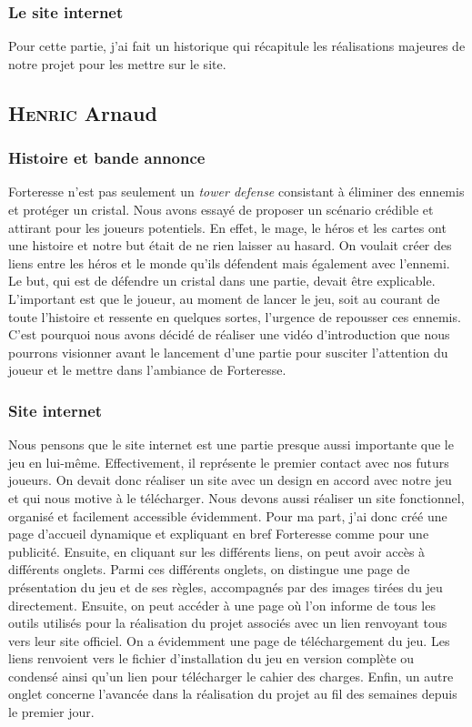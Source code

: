 \documentclass[a4paper, 12pt]{article}
\begin{document}
\subsubsection{Le site internet}
Pour cette partie, j'ai fait un historique qui r\'ecapitule les r\'ealisations majeures de notre projet pour les mettre sur le site.


	\subsection{\textsc{Henric} Arnaud}
	\subsubsection{Histoire et bande annonce}
	Forteresse n’est pas seulement un \textit{tower defense} consistant à éliminer des ennemis et protéger un cristal. Nous avons essayé de proposer un scénario crédible et attirant pour les joueurs potentiels. En effet, le mage, le héros et les cartes ont une histoire et notre but était de ne rien laisser au hasard. On voulait créer des liens entre les héros et le monde qu’ils défendent mais également avec l’ennemi. Le but, qui est de défendre un cristal dans une partie, devait être explicable. L’important est que le joueur, au moment de lancer le jeu, soit au courant de toute l’histoire et ressente en quelques sortes, l’urgence de repousser ces ennemis. C’est pourquoi nous avons décidé de réaliser une vidéo d’introduction que nous pourrons visionner avant le lancement d’une partie pour susciter l’attention du joueur et le mettre dans l’ambiance de Forteresse.

		\subsubsection{Site internet}

Nous pensons que le site internet est une partie presque aussi importante que le jeu en lui-même. Effectivement, il représente le premier contact avec nos futurs joueurs. On devait donc réaliser un site avec un design en accord avec notre jeu et qui nous motive à le télécharger. Nous devons aussi réaliser un site fonctionnel, organisé et facilement accessible évidemment. Pour ma part, j’ai donc créé une page d’accueil dynamique et expliquant en bref Forteresse comme pour une publicité. Ensuite, en cliquant sur les différents liens, on peut avoir accès à différents onglets. Parmi ces différents onglets, on distingue une page de présentation du jeu et de ses règles, accompagnés par des images tirées du jeu directement. Ensuite, on peut accéder à une page où l’on informe de tous les outils utilisés pour la réalisation du projet associés avec un lien renvoyant tous vers leur site officiel. On a évidemment une page de téléchargement du jeu. Les liens renvoient vers le fichier d’installation du jeu en version complète ou condensé ainsi qu’un lien pour télécharger le cahier des charges. Enfin, un autre onglet concerne l’avancée dans la réalisation du projet au fil des semaines depuis le premier jour.
\end{document}
